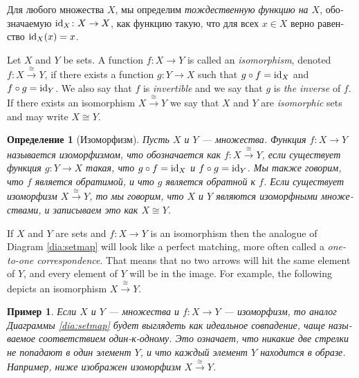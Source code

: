 \documentclass[a4paper]{book}
\def\tn{\textnormal}
\def\to{\rightarrow}
\def\taking{\colon}
\def\iso{\cong}
\newcommand{\To}[1]{\xrightarrow{#1}}
\def\id{\tn{id}}
\theoremstyle{myth}
\newtheorem{exampleENG}[envENG]{\begin{english}Example\end{english}}
\newtheorem{definitionENG}[envENG]{\begin{english}Definition\end{english}}
\newtheorem{exampleRUS}[envRUS]{Пример}
\newtheorem{definitionRUS}[envRUS]{Определение}
\begin{document}
\begin{russian}
Для любого множества $X$, мы определим {\em тождественную функцию на $X$}, обозначаемую $\id_X\taking X\to X$, как функцию такую, что для всех $x\in X$ верно равенство $\id_X(x)=x$.\index{символ!$\id_X$}

\begin{definitionENG}[Isomorphism]\label{def:iso in set} 
Let $X$ and $Y$ be sets. A function $f\taking X\to Y$ is called an {\em isomorphism}, denoted $f\taking X\To{\iso}Y$, if there exists a function $g\taking Y\to X$ such that $g\circ f=\id_X$ and $f\circ g=\id_Y$. We also say that $f$ is {\em invertible} and we say that $g$ is {\em the inverse} of $f$. If there exists an isomorphism $X\To\iso Y$ we say that $X$ and $Y$ are {\em isomorphic} sets and may write $X\iso Y$. \index{a symbol!$\iso$}
\end{definitionENG}

\begin{definitionRUS}[Изоморфизм]\label{def:iso in set}
Пусть $X$ и $Y$ — множества. Функция $f\taking X\to Y$ называется {\em изоморфизмом}, что обозначается как $f\taking X\To{\iso}Y$, если существует функция $g\taking Y\to X$ такая, что $g\circ f=\id_X$ и $f\circ g=\id_Y$. Мы также говорим, что $f$ является {\em обратимой}, и что $g$ является {\em обратной} к $f$. Если существует изоморфизм $X\To\iso Y$, то мы говорим, что $X$ и $Y$ являются {\em изоморфными} множествами, и записываем это как $X\iso Y$. \index{символ!$\iso$}
\end{definitionRUS}

\begin{exampleENG}
If $X$ and $Y$ are sets and $f\taking X\to Y$ is an isomorphism then the analogue of Diagram \ref{dia:setmap} will look like a perfect matching, more often called a {\em one-to-one correspondence}. That means that no two arrows will hit the same element of $Y$, and every element of $Y$ will be in the image. For example, the following depicts an isomorphism $X\To{\iso}Y$.
\end{exampleENG}

\begin{exampleRUS}
Если $X$ и $Y$ — множества и $f\taking X\to Y$ — изоморфизм, то аналог Диаграммы \ref{dia:setmap} будет выглядеть как идеальное совпадение, чаще называемое {\em соответствием один-к-одному}. Это означает, что никакие две стрелки не попадают в один элемент $Y$, и что каждый элемент $Y$ находится в образе. Например, ниже изображен изоморфизм $X\To{\iso}Y$.
\end{exampleRUS}


\end{russian}
\end{document}
